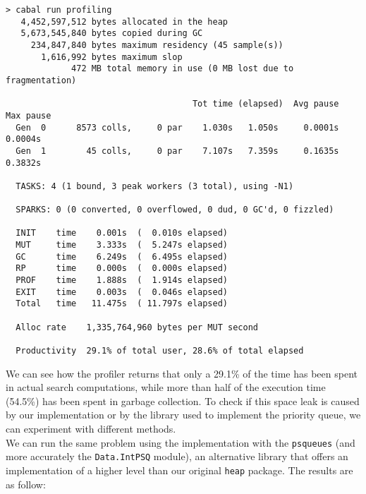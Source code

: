 \begin{lstlisting}
> cabal run profiling
   4,452,597,512 bytes allocated in the heap
   5,673,545,840 bytes copied during GC
     234,847,840 bytes maximum residency (45 sample(s))
       1,616,992 bytes maximum slop
             472 MB total memory in use (0 MB lost due to fragmentation)

                                     Tot time (elapsed)  Avg pause  Max pause
  Gen  0      8573 colls,     0 par    1.030s   1.050s     0.0001s    0.0004s
  Gen  1        45 colls,     0 par    7.107s   7.359s     0.1635s    0.3832s

  TASKS: 4 (1 bound, 3 peak workers (3 total), using -N1)

  SPARKS: 0 (0 converted, 0 overflowed, 0 dud, 0 GC'd, 0 fizzled)

  INIT    time    0.001s  (  0.010s elapsed)
  MUT     time    3.333s  (  5.247s elapsed)
  GC      time    6.249s  (  6.495s elapsed)
  RP      time    0.000s  (  0.000s elapsed)
  PROF    time    1.888s  (  1.914s elapsed)
  EXIT    time    0.003s  (  0.046s elapsed)
  Total   time   11.475s  ( 11.797s elapsed)

  Alloc rate    1,335,764,960 bytes per MUT second

  Productivity  29.1% of total user, 28.6% of total elapsed
\end{lstlisting}


We can see how the profiler returns that only a 29.1\% of the time has been
spent in actual search computations, while more than half of the execution time
(54.5\%) has been spent in garbage collection. To check if this space leak is
caused by our implementation or by the library used to implement the priority
queue, we can experiment with different methods.\\

We can run the same problem using the implementation with the \texttt{psqueues}
(and more accurately the \texttt{Data.IntPSQ} module), an alternative library
that offers an implementation of a higher level than our original \texttt{heap}
package. The results are as follow:\\


